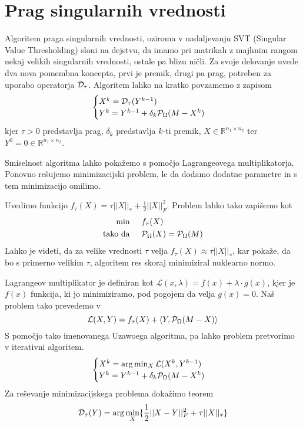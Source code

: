 \section{Prag singularnih vrednosti}
Algoritem praga singularnih vrednosti, oziroma v nadaljevanju SVT (Singular Value Thresholding) sloni na dejstvu, da imamo pri matrikah z majhnim rangom nekaj velikih singularnih vrednosti, ostale pa blizu ničli. Za svoje delovanje uvede dva nova pomembna koncepta, prvi je premik, drugi pa prag, potreben za uporabo operatorja $\mathcal{D}_\tau$. Algoritem lahko na kratko povzamemo z zapisom
\[
    \begin{cases}
        X^k = \mathcal{D}_\tau(Y^{k-1}) \\
        Y^k = Y^{k-1} + \delta_k \mathcal{P}_\Omega(M - X^k) 
    \end{cases}
\]
kjer $\tau > 0$ predstavlja prag, $\delta_k$ predstavlja $k$-ti premik, $X \in \mathbb{R}^{n_1 \times n_2}$ ter
$Y^0 = 0 \in \mathbb{R}^{n_1 \times n_2}$. \cite{CCS}

Smiselnost algoritma lahko pokažemo s pomočjo Lagrangeovega multiplikatorja. Ponovno rešujemo minimizacijski problem, le da dodamo dodatne parametre in s tem minimizacijo omilimo. 

Uvedimo funkcijo $f_\tau(X) = \tau||X||_* + \frac{1}{2}||X||^2_F$. Problem lahko tako zapišemo kot 
\begin{align}
\label{2706-0957}
\begin{split}
    \textrm{min} & \hspace{0.5cm} f_\tau(X) \\
    \textrm{tako da} & \hspace{0.5cm} \mathcal{P}_\Omega(X) = \mathcal{P}_\Omega(M)
\end{split}
\end{align}
Lahko je videti, da za velike vrednosti $\tau$ velja $f_\tau(X) \approx \tau||X||_*$, kar pokaže, da bo s primerno velikim $\tau$, algoritem res skoraj minimiziral nuklearno normo.

Lagrangeov multiplikator je definiran kot $\mathcal{L}(x, \lambda) = f(x) + \lambda \cdot g(x)$, kjer je $f(x)$ funkcija, ki jo minimiziramo, pod pogojem da velja $g(x) = 0$. Naš problem tako prevedemo v
\[
    \mathcal{L}(X, Y) = f_\tau(X) + \left< Y, \mathcal{P}_\Omega(M - X) \right>
\] 
S pomočjo tako imenovanega Uzawoega algoritma, pa lahko problem pretvorimo v iterativni algoritem. \cite{CCS}
\[
    \begin{cases}
        X^k =  \arg \min_{X} \mathcal{L}(X^k, Y^{k-1}) \\
        Y^k = Y^{k-1} + \delta_k \mathcal{P}_\Omega(M - X^k) 
    \end{cases}
\] 
Za reševanje minimizacijskega problema dokažimo teorem
\begin{equation}
    \label{2906-1056}
    \mathcal{D}_\tau(Y) = \arg \min_{X} \{ \frac{1}{2} ||X - Y||^2_F + \tau||X||_* \}
\end{equation}

